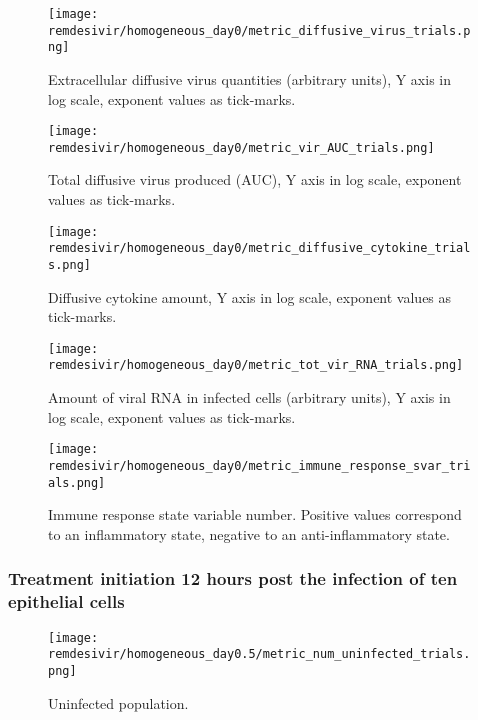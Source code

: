 \begin{figure}[H]
\texttt{[image: remdesivir/homogeneous\_day0/metric\_diffusive\_virus\_trials.png]}
\caption{Extracellular diffusive virus quantities (arbitrary units), Y axis in log scale, exponent values as tick-marks.\label{fig:app:homo_regular:day0:diff_vir}}
\end{figure}

\begin{figure}[H]
\texttt{[image: remdesivir/homogeneous\_day0/metric\_vir\_AUC\_trials.png]}
\caption{Total diffusive virus produced (AUC), Y axis in log scale, exponent values as tick-marks. \label{fig:app:homo_regular:day0:auc_vir}}
\end{figure}

\begin{figure}[H]
\texttt{[image: remdesivir/homogeneous\_day0/metric\_diffusive\_cytokine\_trials.png]}
\caption{Diffusive cytokine amount, Y axis in log scale, exponent values as tick-marks.\label{fig:app:homo_regular:day0:diff_cyto}}
\end{figure}

\begin{figure}[H]
\texttt{[image: remdesivir/homogeneous\_day0/metric\_tot\_vir\_RNA\_trials.png]}
\caption{Amount of viral RNA in infected cells (arbitrary units), Y axis in log scale, exponent values as tick-marks.\label{fig:app:homo_regular:day0:vir_RNA}}
\end{figure}

\begin{figure}[H]
\texttt{[image: remdesivir/homogeneous\_day0/metric\_immune\_response\_svar\_trials.png]}
\caption{Immune response state variable number. Positive values correspond to an inflammatory state, negative to an anti-inflammatory state. \label{fig:app:homo_regular:day0:immune_var}}
\end{figure}



\subsubsection{Treatment initiation 12 hours post the infection of ten epithelial cells}\label{sup:sec:extra_figures:homo_regular:day0.5}

\begin{figure}[H]
\texttt{[image: remdesivir/homogeneous\_day0.5/metric\_num\_uninfected\_trials.png]}
\caption{Uninfected population.\label{fig:app:homo_regular:day0.5:uninf}}
\end{figure}

